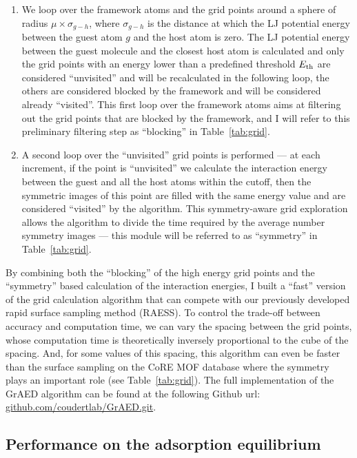 \documentclass[main]{subfiles}
\begin{document}
\begin{enumerate}
  \item We loop over the framework atoms and the grid points around a sphere of radius $\mu\times\sigma_{g-h}$, where $\sigma_{g-h}$ is the distance at which the LJ potential energy between the guest atom $g$ and the host atom is zero. The LJ potential energy between the guest molecule and the closest host atom is calculated and only the grid points with an energy lower than a predefined threshold $E_{\text{th}}$ are considered ``unvisited'' and will be recalculated in the following loop, the others are considered blocked by the framework and will be considered already ``visited''. This first loop over the framework atoms aims at filtering out the grid points that are blocked by the framework, and I will refer to this preliminary filtering step as ``blocking'' in Table~\ref{tab:grid}.
  \item A second loop over the ``unvisited'' grid points is performed --- at each increment, if the point is ``unvisited'' we calculate the interaction energy between the guest and all the host atoms within the cutoff, then the symmetric images of this point are filled with the same energy value and are considered ``visited'' by the algorithm. This symmetry-aware grid exploration allows the algorithm to divide the time required by the average number symmetry images --- this module will be referred to as ``symmetry'' in Table~\ref{tab:grid}.
\end{enumerate}

By combining both the ``blocking'' of the high energy grid points and the ``symmetry'' based calculation of the interaction energies, I built a ``fast'' version of the grid calculation algorithm that can compete with our previously developed rapid surface sampling method (RAESS). To control the trade-off between accuracy and computation time, we can vary the spacing between the grid points, whose computation time is theoretically inversely proportional to the cube of the spacing. And, for some values of this spacing, this algorithm can even be faster than the surface sampling on the CoRE MOF database where the symmetry plays an important role (see Table~\ref{tab:grid}). The full implementation of the GrAED algorithm can be found at the following Github url: \url{github.com/coudertlab/GrAED.git}.

\subsection{Performance on the adsorption equilibrium}
\end{document}

